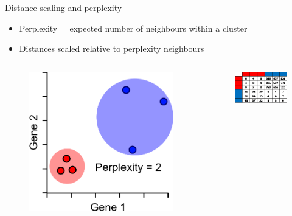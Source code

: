 \begin{frame}[allowframebreaks]{Distance scaling and perplexity}
    \begin{itemize}
        \item Perplexity = expected number of neighbours within a cluster
        \item Distances scaled relative to perplexity neighbours
    \end{itemize}
    \begin{columns}
    \begin{column}{0.5\textwidth}
        \begin{figure}
            \centering
            \includegraphics[width=1\textwidth,keepaspectratio]{images/dul/dim-reduce/tsne-distance-scaling.png}
        \end{figure}
    \end{column}
    \begin{column}{0.5\textwidth}
        \begin{figure}
            \centering
            \includegraphics[width=1\textwidth,keepaspectratio]{images/dul/dim-reduce/tsne-distance-scaling-matrix.png}
        \end{figure}
    \end{column}
    \end{columns}
\end{frame}

